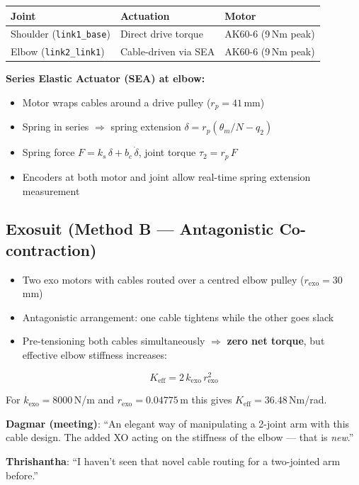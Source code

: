 \documentclass[11pt, a4paper]{article}
\newcommand{\Ke}{K_{\mathrm{eff}}}
\begin{document}
\begin{center}
\begin{tabular}{lll}
\toprule
\textbf{Joint} & \textbf{Actuation} & \textbf{Motor} \\
\midrule
Shoulder (\texttt{link1\_base}) & Direct drive torque & AK60-6 (9\,Nm peak) \\
Elbow (\texttt{link2\_link1})   & Cable-driven via SEA & AK60-6 (9\,Nm peak) \\
\bottomrule
\end{tabular}
\end{center}

\textbf{Series Elastic Actuator (SEA) at elbow:}
\begin{itemize}[nosep]
  \item Motor wraps cables around a drive pulley ($r_p = 41$\,mm)
  \item Spring in series $\Rightarrow$ spring extension $\delta = r_p(\theta_m/N - q_2)$
  \item Spring force $F = k_s\,\delta + b_c\,\dot\delta$, joint torque $\tau_2 = r_p\,F$
  \item Encoders at both motor and joint allow real-time spring extension measurement
\end{itemize}

\subsection{Exosuit (Method B --- Antagonistic Co-contraction)}

\begin{itemize}[nosep]
  \item Two exo motors with cables routed over a centred elbow pulley ($r_{\mathrm{exo}} = 30$\,mm)
  \item Antagonistic arrangement: one cable tightens while the other goes slack
  \item Pre-tensioning both cables simultaneously $\Rightarrow$ \textbf{zero net torque}, but
        effective elbow stiffness increases:
\end{itemize}
\begin{equation}
  \Ke = 2\,k_{\mathrm{exo}}\,r_{\mathrm{exo}}^2
  \label{eq:keff}
\end{equation}

For $k_{\mathrm{exo}} = 8000$\,N/m and $r_{\mathrm{exo}} = 0.04775$\,m this gives
$\Ke = 36.48$\,Nm/rad.

\begin{infobox}
\textbf{Dagmar (meeting)}: ``An elegant way of manipulating a 2-joint arm with this cable
design. The added XO acting on the stiffness of the elbow --- that is \emph{new}.''

\textbf{Thrishantha}: ``I haven't seen that novel cable routing for a two-jointed arm before.''
\end{infobox}
\end{document}

